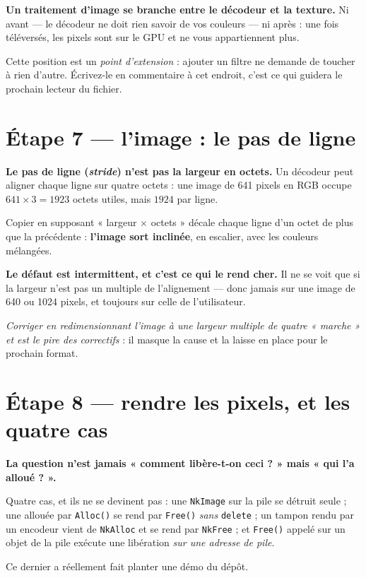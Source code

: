 \begin{nkretenir}
\textbf{Un traitement d'image se branche entre le décodeur et la texture.} Ni
avant --- le décodeur ne doit rien savoir de vos couleurs --- ni après : une fois
téléversés, les pixels sont sur le GPU et ne vous appartiennent plus.

Cette position est un \emph{point d'extension} : ajouter un filtre ne demande de
toucher à rien d'autre. Écrivez-le en commentaire à cet endroit, c'est ce qui
guidera le prochain lecteur du fichier.
\end{nkretenir}

\section{Étape 7 --- l'image : le pas de ligne}

\begin{nkretenir}
\textbf{Le pas de ligne (\emph{stride}) n'est pas la largeur en octets.} Un
décodeur peut aligner chaque ligne sur quatre octets : une image de 641 pixels en
RGB occupe $641 \times 3 = 1923$ octets utiles, mais $1924$ par ligne.

Copier en supposant « largeur $\times$ octets » décale chaque ligne d'un octet de
plus que la précédente : \textbf{l'image sort inclinée}, en escalier, avec les
couleurs mélangées.
\end{nkretenir}

\begin{nkpiege}
\textbf{Le défaut est intermittent, et c'est ce qui le rend cher.} Il ne se voit
que si la largeur n'est pas un multiple de l'alignement --- donc jamais sur une
image de 640 ou 1024 pixels, et toujours sur celle de l'utilisateur.

\emph{Corriger en redimensionnant l'image à une largeur multiple de quatre
« marche » et est le pire des correctifs} : il masque la cause et la laisse en
place pour le prochain format.
\end{nkpiege}

\section{Étape 8 --- rendre les pixels, et les quatre cas}

\begin{nkretenir}
\textbf{La question n'est jamais « comment libère-t-on ceci ? » mais « qui l'a
alloué ? ».}

Quatre cas, et ils ne se devinent pas : une \texttt{NkImage} sur la pile se
détruit seule ; une allouée par \texttt{Alloc()} se rend par \texttt{Free()}
\emph{sans} \texttt{delete} ; un tampon rendu par un encodeur vient de
\texttt{NkAlloc} et se rend par \texttt{NkFree} ; et \texttt{Free()} appelé sur
un objet de la pile exécute une libération \emph{sur une adresse de pile}.

Ce dernier a réellement fait planter une démo du dépôt.
\end{nkretenir}

